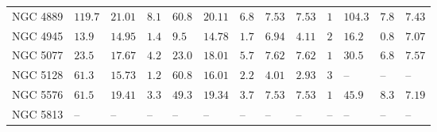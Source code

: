 \begin{table*}
\begin{center}
\begin{tabular}{lllllllllllll}
NGC 4889  \quad &  $119.7$  &  $21.01$  &  $8.1$  \quad \quad &  $60.8$  &  $20.11$  &  $6.8$  &  $7.53$  &  $7.53$  \quad \quad &  $1$  \quad \quad &  $104.3$  &  $7.8$  &  $7.43$  \\ 
NGC 4945  \quad &  $13.9$  &  $14.95$  &  $1.4$  \quad \quad &  $9.5$  &  $14.78$  &  $1.7$  &  $6.94$  &  $4.11$  \quad \quad &  $2$  \quad \quad &  $16.2$  &  $0.8$  &  $7.07$  \\ 
NGC 5077  \quad &  $23.5$  &  $17.67$  &  $4.2$  \quad \quad &  $23.0$  &  $18.01$  &  $5.7$  &  $7.62$  &  $7.62$  \quad \quad &  $1$  \quad \quad &  $30.5$  &  $6.8$  &  $7.57$  \\ 
NGC 5128  \quad &  $61.3$  &  $15.73$  &  $1.2$  \quad \quad &  $60.8$  &  $16.01$  &  $2.2$  &  $4.01$  &  $2.93$  \quad \quad &  $3$  \quad \quad &   -- &   -- &   --    \\ 
NGC 5576  \quad &  $61.5$  &  $19.41$  &  $3.3$  \quad \quad &  $49.3$  &  $19.34$  &  $3.7$  &  $7.53$  &  $7.53$  \quad \quad &  $1$  \quad \quad &  $45.9$  &  $8.3$  &  $7.19$  \\ 
NGC 5813  \quad &   -- &   -- &   -- \quad \quad &   -- &   -- &   -- &   -- &   -- \quad \quad & 
 -- \quad \quad & 
 -- &   -- &   --    \\ 
\hline         
\end{tabular}   
\label{tab:fitres} 
\end{center}    
\end{table*}    

